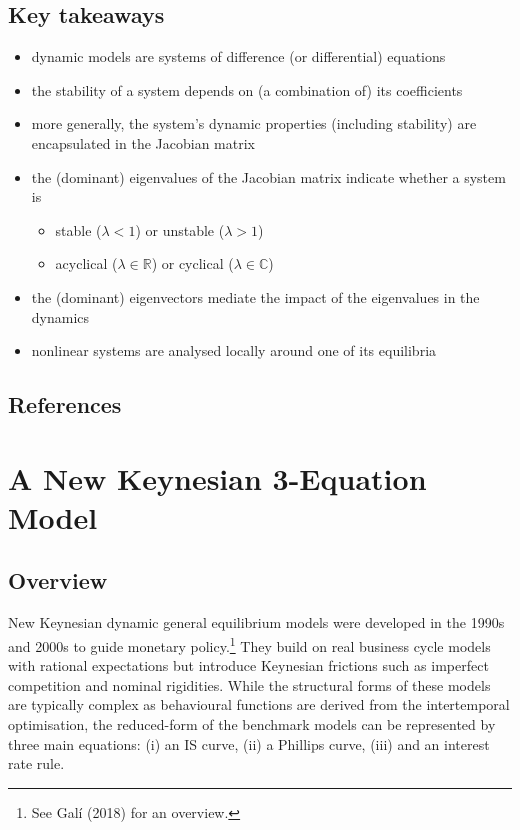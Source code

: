 \documentclass[
  letterpaper,
  DIV=11,
  numbers=noendperiod]{scrreprt}
\providecommand{\tightlist}{%
  \setlength{\itemsep}{0pt}\setlength{\parskip}{0pt}}\usepackage{longtable,booktabs,array}
\begin{document}
\section{Key takeaways}\label{key-takeaways}

\begin{itemize}
\tightlist
\item
  dynamic models are systems of difference (or differential) equations
\item
  the stability of a system depends on (a combination of) its
  coefficients
\item
  more generally, the system's dynamic properties (including stability)
  are encapsulated in the Jacobian matrix
\item
  the (dominant) eigenvalues of the Jacobian matrix indicate whether a
  system is

  \begin{itemize}
  \tightlist
  \item
    stable (\(\lambda < 1\)) or unstable (\(\lambda > 1\))
  \item
    acyclical (\(\lambda \in \mathbb{R}\)) or cyclical
    (\(\lambda \in \mathbb{C}\))
  \end{itemize}
\item
  the (dominant) eigenvectors mediate the impact of the eigenvalues in
  the dynamics
\item
  nonlinear systems are analysed locally around one of its equilibria
\end{itemize}

\section{References}\label{references-7}

\chapter{A New Keynesian 3-Equation
Model}\label{a-new-keynesian-3-equation-model}

\section{Overview}\label{overview-6}

New Keynesian dynamic general equilibrium models were developed in the
1990s and 2000s to guide monetary policy.\footnote{See Galí (2018) for
  an overview.} They build on real business cycle models with rational
expectations but introduce Keynesian frictions such as imperfect
competition and nominal rigidities. While the structural forms of these
models are typically complex as behavioural functions are derived from
the intertemporal optimisation, the reduced-form of the benchmark models
can be represented by three main equations: (i) an IS curve, (ii) a
Phillips curve, (iii) and an interest rate rule.
\end{document}

